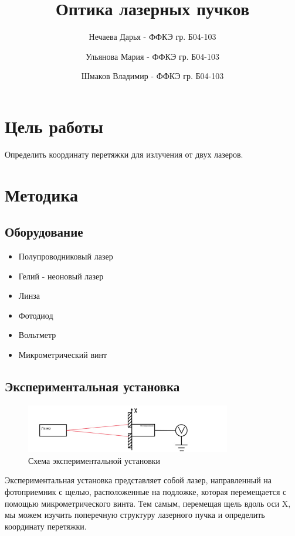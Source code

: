 \documentclass[a4paper, 12pt]{extarticle}
\title{\textcolor{main_title}{Оптика лазерных пучков}}
\author{
    Нечаева Дарья - ФФКЭ гр. Б04-103 \and
    Ульянова Мария - ФФКЭ гр. Б04-103 \and
    Шмаков Владимир - ФФКЭ гр. Б04-103 
}
\begin{document}
\maketitle



\section*{\textcolor{header}{Цель работы}}
    Определить координату перетяжки для излучения от двух лазеров.



\section*{\textcolor{header}{Методика}}

\subsection*{\textcolor{sub_header}{Оборудование}}
\begin{itemize}
    \item Полупроводниковый лазер
    \item Гелий - неоновый лазер
    \item Линза
    \item Фотодиод
    \item Вольтметр
    \item Микрометрический винт
\end{itemize}

\subsection*{\textcolor{sub_header}{Экспериментальная установка}}
\begin{figure}[htbp]
    \centering
    \includegraphics[width = 0.8\textwidth]{ustanovka.jpg}
    \caption{Схема экспериментальной установки}
    \label{<label>}
\end{figure}
Экспериментальная установка представляет собой лазер, направленный на фотоприемник с щелью, расположенные на подложке, которая перемещается с помощью микрометрического винта. Тем самым, перемещая щель вдоль оси X, мы можем изучить поперечную структуру лазерного пучка и определить координату перетяжки.
\end{document}
